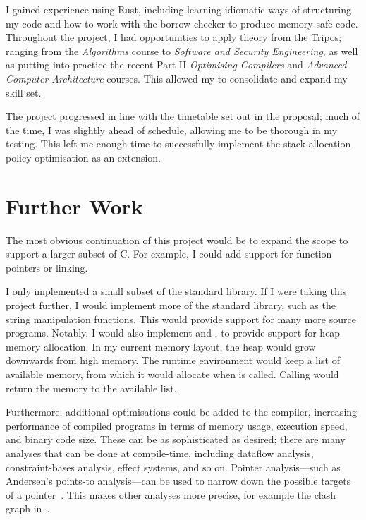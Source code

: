 \documentclass[00-main.tex]{subfiles}
\begin{document}
I gained experience using Rust, including learning idiomatic ways of structuring my code and how to work with the borrow checker to produce memory-safe code.
Throughout the project, I had opportunities to apply theory from the Tripos; ranging from the \emph{Algorithms} course to \emph{Software and Security Engineering}, as well as putting into practice the recent Part II \emph{Optimising Compilers} and \emph{Advanced Computer Architecture} courses.
This allowed my to consolidate and expand my skill set.

The project progressed in line with the timetable set out in the proposal; much of the time, I was slightly ahead of schedule, allowing me to be thorough in my testing.
This left me enough time to successfully implement the stack allocation policy optimisation as an extension.

\section{Further Work}

The most obvious continuation of this project would be to expand the scope to support a larger subset of C.
For example, I could add support for function pointers or linking.

I only implemented a small subset of the standard library.
If I were taking this project further, I would implement more of the standard library, such as the string manipulation functions.
This would provide support for many more source programs.
Notably, I would also implement  and , to provide support for heap memory allocation.
In my current memory layout, the heap would grow downwards from high memory.
The runtime environment would keep a list of available memory, from which it would allocate when  is called.
Calling  would return the memory to the available list.

Furthermore, additional optimisations could be added to the compiler, increasing performance of compiled programs in terms of memory usage, execution speed, and binary code size.
These can be as sophisticated as desired; there are many analyses that can be done at compile-time, including dataflow analysis, constraint-bases analysis, effect systems, and so on.
Pointer analysis---such as Andersen's points-to analysis---can be used to narrow down the possible targets of a pointer~.
This makes other analyses more precise, for example the clash graph in~.
\end{document}

